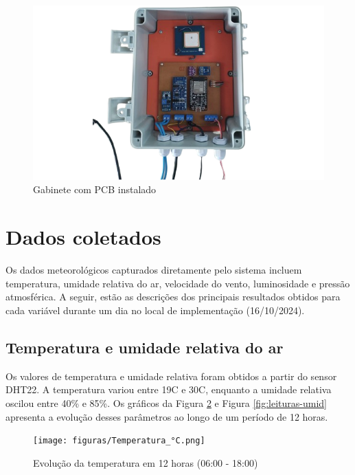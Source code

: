 \begin{figure}[!htb] \centering
\caption{Gabinete com PCB instalado} \label{figura:gab-proj}
\begin{varwidth}{\linewidth}
\includegraphics[width=16cm]{figuras/gab-proj.png}
\end{varwidth}
\end{figure}

\section{Dados coletados}

Os dados meteorológicos capturados diretamente pelo sistema incluem temperatura, umidade relativa do ar, velocidade do vento, luminosidade e pressão atmosférica. A seguir, estão as descrições dos principais resultados obtidos para cada variável durante um dia no local de implementação (16/10/2024).

\subsection{Temperatura e umidade relativa do ar}
Os valores de temperatura e umidade relativa foram obtidos a partir do sensor DHT22. A temperatura variou entre 19\textdegree C e 30\textdegree C, enquanto a umidade relativa oscilou entre 40\% e 85\%. Os gráficos da Figura \ref{fig:leituras-temp} e Figura \ref{fig:leituras-umid} apresenta a evolução desses parâmetros ao longo de um período de 12 horas.

\begin{figure}[!htb] \centering
  \caption{Evolução da temperatura em 12 horas (06:00 - 18:00)} \label{fig:leituras-temp}
  \begin{varwidth}{\linewidth}
    \texttt{[image: figuras/Temperatura\_°C.png]}
  \end{varwidth}
\end{figure}

